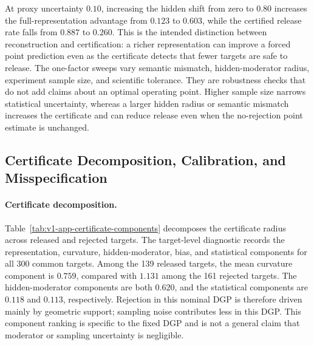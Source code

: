 \documentclass[11pt]{article}
\numberwithin{equation}{section}
\newcommand{\1}{\mathbf 1}
\begin{document}


At proxy uncertainty $0.10$, increasing the hidden shift from zero to $0.80$ increases the full-representation advantage from $0.123$ to $0.603$, while the certified release rate falls from $0.887$ to $0.260$.  This is the intended distinction between reconstruction and certification: a richer representation can improve a forced point prediction even as the certificate detects that fewer targets are safe to release.  The one-factor sweeps vary semantic mismatch, hidden-moderator radius, experiment sample size, and scientific tolerance.  They are robustness checks that do not add claims about an optimal operating point.  Higher sample size narrows statistical uncertainty, whereas a larger hidden radius or semantic mismatch increases the certificate and can reduce release even when the no-rejection point estimate is unchanged.


\subsection{Certificate Decomposition, Calibration, and Misspecification}
\label{app:certificate-calibration}
\suppressfloats[t]

\paragraph{Certificate decomposition.}
Table~\ref{tab:v1-app-certificate-components} decomposes the certificate radius across released and rejected targets.
The target-level diagnostic records the representation, curvature, hidden-moderator, bias, and statistical components for all 300 common targets.  Among the 139 released targets, the mean curvature component is $0.759$, compared with $1.131$ among the 161 rejected targets.  The hidden-moderator components are both $0.620$, and the statistical components are $0.118$ and $0.113$, respectively.  Rejection in this nominal DGP is therefore driven mainly by geometric support; sampling noise contributes less in this DGP.  This component ranking is specific to the fixed DGP and is not a general claim that moderator or sampling uncertainty is negligible.


\end{document}
